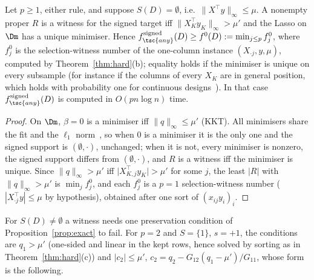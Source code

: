 \begin{proposition}\label{prop:signed-empty}
Let $p\ge1$, either rule, and suppose $S(D)=\emptyset$, i.e.\ $\lVert X^{\top}y\rVert_\infty\le\mu$. A nonempty proper $R$ is a witness for the signed  target iff $\lVert X_K^{\top}y_K\rVert_\infty>\mu'$ and the Lasso on $\Dm$ has a unique minimiser. Hence $f^{\mathrm{signed}}_{\tsc{any}}(D)\ge f^{0}(D):=\min_{j\le p}f^{0}_j$, where $f^{0}_j$ is the selection-witness number of the one-column instance $(X_{\cdot j},y,\mu)$, computed by Theorem~\ref{thm:hard}(b); equality holds if the minimiser is unique on every subsample (for instance if the columns of every $X_K$ are in general position, which holds with probability one for continuous designs~\citep{tibshirani2013}). In that case $f^{\mathrm{signed}}_{\tsc{any}}(D)$ is computed in $O(pn\log n)$ time.
\end{proposition}
\begin{proof}
On $\Dm$, $\beta=0$ is a minimiser iff $\lVert q\rVert_\infty\le\mu'$ (KKT). All minimisers share the fit and the $\ell_1$ norm~\citep{tibshirani2013}, so when $0$ is a minimiser it is the only one and the signed support is $(\emptyset,\cdot)$, unchanged; when it is not, every minimiser is nonzero, the signed support differs from $(\emptyset,\cdot)$, and $R$ is a witness iff the minimiser is unique. Since $\lVert q\rVert_\infty>\mu'$ iff $\lvert X_{K,j}^{\top}y_K\rvert>\mu'$ for some $j$, the least $|R|$ with $\lVert q\rVert_\infty>\mu'$ is $\min_jf^{0}_j$, and each $f^0_j$ is a $p=1$ selection-witness number ($|X_{\cdot j}^{\top}y|\le\mu$ by hypothesis), obtained after one sort of $(x_{ij}y_i)_i$.
\end{proof}

For $S(D)\neq\emptyset$ a witness needs one preservation condition of Proposition~\ref{prop:exact} to fail. For $p=2$ and $S=\{1\}$, $s=+1$, the conditions are $q_1>\mu'$ (one-sided and linear in the kept rows, hence solved by sorting as in Theorem~\ref{thm:hard}(c)) and $\lvert c_2\rvert\le\mu'$, $c_2=q_2-G_{12}(q_1-\mu')/G_{11}$, whose form is the following.

